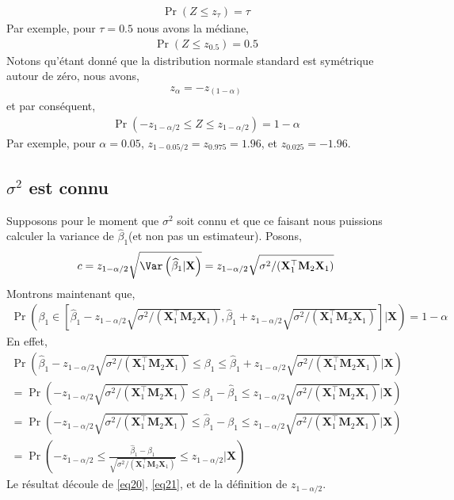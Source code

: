\begin{align*}
\Pr(Z \leq z_\tau) = \tau
\end{align*}
Par exemple, pour $\tau = 0.5$ nous avons la médiane,
\begin{align*}
\Pr(Z \leq z_{0.5}) = 0.5
\end{align*}
Notons qu'étant donné que la distribution normale standard est symétrique autour de zéro, nous avons,
\begin{align*}
z_\alpha = -z_{(1-\alpha)}
\end{align*}
et par conséquent,
\begin{align*}
\Pr(-z_{1 - \alpha/2}\leq Z\leq z_{1-\alpha/2}) = 1-\alpha
\end{align*}
Par exemple, pour $\alpha=0.05$, $z_{1 - 0.05/2} = z_{0.975} = 1.96$, et $z_{0.025} = -1.96$.

\subsection{$\sigma^2$ est connu}
Supposons pour le moment que $\sigma^2$ soit connu et que ce faisant nous puissions calculer la variance de $\widehat{\beta}_1$(et non pas un estimateur). Posons,
\begin{align*}
c = z_{1-\alpha/2}\sqrt{\Var\left(\widehat{\beta}_1| \mathbf{X} \right)}=z_{1-\alpha/2}\sqrt{\sigma^2/(\mathbf{X}_1^\top\mathbf{M}_2\mathbf{X}_1)}
\end{align*}
Montrons maintenant que,
\begin{align*}
\Pr\left(
\beta_1 \in \left[\widehat{\beta}_1 -z_{1-\alpha/2}\sqrt{\sigma^2/(\mathbf{X}_1^\top\mathbf{M}_2\mathbf{X}_1)} , \widehat{\beta}_1+
z_{1-\alpha/2}\sqrt{\sigma^2/(\mathbf{X}_1^\top\mathbf{M}_2\mathbf{X}_1)} \right] | \mathbf{X}\right) = 1-\alpha
\end{align*}
En effet,
\begin{align}
\Pr\left(
\widehat{\beta}_1 -z_{1-\alpha/2}\sqrt{\sigma^2/(\mathbf{X}_1^\top\mathbf{M}_2\mathbf{X}_1)}
\leq \beta_1 \leq
\widehat{\beta}_1+
z_{1-\alpha/2}\sqrt{\sigma^2/(\mathbf{X}_1^\top\mathbf{M}_2\mathbf{X}_1)}  | \mathbf{X}
\right) \nonumber\\
=\Pr\left(
-z_{1-\alpha/2}\sqrt{\sigma^2/(\mathbf{X}_1^\top\mathbf{M}_2\mathbf{X}_1)}
\leq \beta_1 - \widehat{\beta}_1 \leq
z_{1-\alpha/2}\sqrt{\sigma^2/(\mathbf{X}_1^\top\mathbf{M}_2\mathbf{X}_1)}  | \mathbf{X}
\right)\nonumber\\
=\Pr\left(
-z_{1-\alpha/2}\sqrt{\sigma^2/(\mathbf{X}_1^\top\mathbf{M}_2\mathbf{X}_1)}
\leq  \widehat{\beta}_1-\beta_1 \leq
z_{1-\alpha/2}\sqrt{\sigma^2/(\mathbf{X}_1^\top\mathbf{M}_2\mathbf{X}_1)}  | \mathbf{X}
\right)\nonumber\\
=
\Pr\left(
-z_{1-\alpha/2}
\leq  \frac{\widehat{\beta}_1-\beta_1}{\sqrt{\sigma^2/(\mathbf{X}_1^\top\mathbf{M}_2\mathbf{X}_1)}} \leq
z_{1-\alpha/2}  | \mathbf{X}
\right)
\label{eq21}
\end{align}
Le résultat découle de \eqref{eq20}, \eqref{eq21}, et de la définition de $z_{1-\alpha/2}$.

